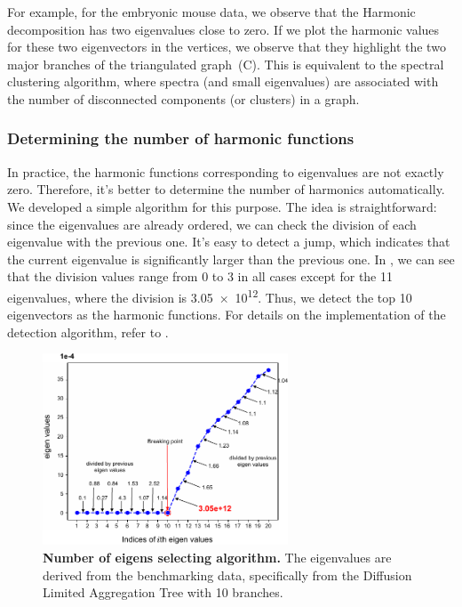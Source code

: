 For example, for the embryonic mouse data, we observe that the Harmonic decomposition has two eigenvalues close to zero. If we plot the harmonic values for these two eigenvectors in the vertices, we observe that they highlight the two major branches of the triangulated graph~(C). This is equivalent to the spectral clustering algorithm, where spectra (and small eigenvalues) are associated with the number of disconnected components (or clusters) in a graph.

\subsubsection{Determining the number of harmonic functions}
In practice, the harmonic functions corresponding to eigenvalues are not exactly zero. Therefore, it's better to determine the number of harmonics automatically. We developed a simple algorithm for this purpose. The idea is straightforward: since the eigenvalues are already ordered, we can check the division of each eigenvalue with the previous one. It's easy to detect a jump, which indicates that the current eigenvalue is significantly larger than the previous one. In , we can see that the division values range from 0 to 3 in all cases except for the 11 eigenvalues, where the division is \num{3.05e+12}. Thus, we detect the top 10 eigenvectors as the harmonic functions. For details on the implementation of the detection algorithm, refer to .

\begin{figure}[!ht]
    \centering
    \includegraphics[width=0.65\textwidth]{breakingpoint/fig}
    \vspace{0.1cm}
    \caption[Number of eigens selecting algorithm.]{\textbf{Number of eigens selecting algorithm.} The eigenvalues are derived from the benchmarking data, specifically from the Diffusion Limited Aggregation Tree with 10 branches.}
    \label{fig:breakingpoint}
\end{figure}

